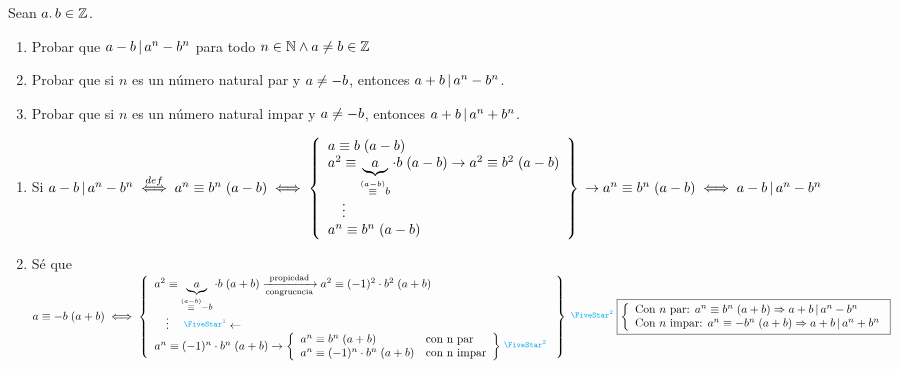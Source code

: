\ejercicio Sean $a.\,b \in \mathbb Z$.
\begin{enumerate}[label=\roman*)]
	\item Probar que $a-b \, | \, a^n - b^n$ para todo $n \in \mathbb N \land a \neq b \in \mathbb Z$
	\item Probar que si $n$ es un número natural par y $a \neq -b$, entonces $a+b \, | \, a^n - b^n$.
	\item Probar que si $n$ es un número natural impar y $a \neq -b$, entonces  $a+b \, | \, a^n + b^n$.
\end{enumerate}
\separadorCorto
\def\aMenosB{\stackrel{(a-b)}\congruente}
\def\aMasB{\stackrel{(a-b)}\congruente}
\begin{enumerate}[label=\roman*)]
	\item  Si $a-b \divideA a^n - b^n \stackrel{def}\sisolosi \congruencia{a^n}{b^n}{a-b} \sisolosi
		      \llaves{l}{
			      \congruencia{a}{b}{a-b} \\
			      \congruencia{a^2}{\ub{a}{\aMenosB b}\cdot b}{a-b} \to \congruencia{a^2}{b^2}{a-b} \\
			      \quad\vdots\\
			      \congruencia{a^n}{b^n}{a-b}
		      }\\
		      \to \congruencia{a^n}{b^n}{a-b} \sisolosi a-b \divideA a^n - b^n$

	\item  Sé que $\congruencia{a}{-b}{a+b} \sisolosi
		      \llaves{l}{
			      \congruencia{a^2}{\ub{a}{\aMasB -b} \cdot b}{a+b} \flecha{propiedad}[congruencia] \congruencia{a^2}{(-1)^2 \cdot b^2}{a+b} \\
			      \quad \vdots \quad \llamada{1}{\ot} \\
			      \congruencia{a^n}{(-1)^n \cdot b^n}{a+b} \to
			      \llaves{ll}{
				      \congruencia{a^n}{ b^n}{a+b} & \text{con n par}  \\
				      \congruencia{a^n}{(-1)^n \cdot b^n}{a+b}   & \text{con n impar} \\
			      }\llamada{2}{}\\
		      }\\
		      \llamada{2}{}
		      \boxed{
			      \llave{l}{
				      \text{Con $n$ par: }  \congruencia{a^n}{ b^n}{a+b} \entonces a+b \divideA a^n - b^n  \\
				      \text{Con $n$ impar: }  \congruencia{a^n}{ - b^n}{a+b} \entonces a+b \divideA a^n + b^n
			      }
		      }
	      $


\end{enumerate}
